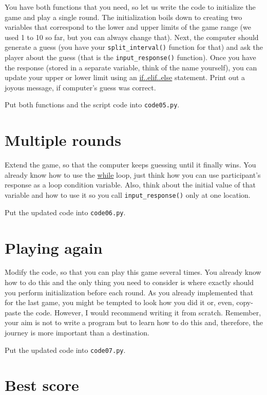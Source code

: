 \documentclass[
]{book}
\begin{document}
You have both functions that you need, so let us write the code to initialize the game and play a single round. The initialization boils down to creating two variables that correspond to the lower and upper limits of the game range (we used 1 to 10 so far, but you can always change that). Next, the computer should generate a guess (you have your \texttt{split\_interval()} function for that) and ask the player about the guess (that is the \texttt{input\_response()} function). Once you have the response (stored in a separate variable, think of the name yourself), you can update your upper or lower limit using an \protect\hyperlink{if-statement}{if..elif..else} statement. Print out a joyous message, if computer's guess was correct.

Put both functions and the script code into \texttt{code05.py}.

\hypertarget{multiple-rounds}{%
\section{Multiple rounds}\label{multiple-rounds}}

Extend the game, so that the computer keeps guessing until it finally wins. You already know how to use the \protect\hyperlink{while-loop}{while} loop, just think how you can use participant's response as a loop condition variable. Also, think about the initial value of that variable and how to use it so you call \texttt{input\_response()} only at one location.

Put the updated code into \texttt{code06.py}.

\hypertarget{playing-again}{%
\section{Playing again}\label{playing-again}}

Modify the code, so that you can play this game several times. You already know how to do this and the only thing you need to consider is where exactly should you perform initialization before each round. As you already implemented that for the last game, you might be tempted to look how you did it or, even, copy-paste the code. However, I would recommend writing it from scratch. Remember, your aim is not to write a program but to learn how to do this and, therefore, the journey is more important than a destination.

Put the updated code into \texttt{code07.py}.

\hypertarget{best-score-1}{%
\section{Best score}\label{best-score-1}}
\end{document}
